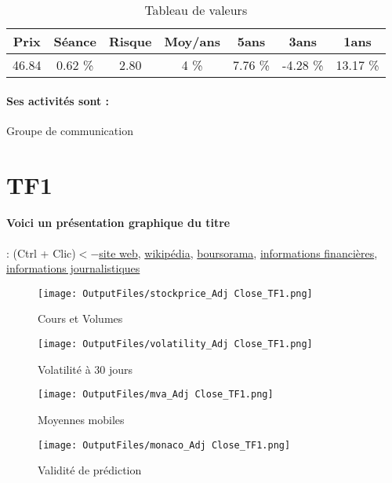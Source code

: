 \documentclass[11pt,a4paper]{report}%
\begin{document}
\begin{table}[H]
  \centering
    \begin{tabular}{|c|c|c|c|c|c|c|}
    \hline
    Prix & Séance & Risque  & Moy/ans & 5ans & 3ans & 1ans \\
    \hline
    46.84 &    0.62 \%    & 2.80 & 4 \% & 7.76 \% & -4.28 \% & 13.17 \% \\
    \hline
    \end{tabular}%
        \label{tab:table_PUBLICIS GROUPE}%
      \caption{Tableau de valeurs}
\end{table}%

\paragraph{Ses activités sont : } Groupe de communication 
    
    \newpage

\section{TF1}

\paragraph{Voici un présentation graphique du titre} : (Ctrl + Clic)$<-$\href{https://groupe-tf1.fr/fr/investisseurs/resultat-et-publication}{site web}, \href{https://fr.wikipedia.org/wiki/TF1}{wikipédia}, \href{https://www.boursorama.com/cours/1rPTFI}{boursorama}, \href{https://www.qwant.com/?q=site:https:%2f%2fwww.easybourse.com%2faction-societe%2fTF1&t=web&client=ext-firefox-hp}{informations financières}, \href{https://bourse.lerevenu.com/cours-de-bourse/fiche-valeur-synthese/TF1/TFI-FR}{informations journalistiques}
\begin{figure}[!htb]
   \begin{minipage}{0.5\textwidth}
     \centering
     \texttt{[image: OutputFiles/stockprice\_Adj Close\_TF1.png]}
     \caption{Cours et Volumes}\label{Fig:price_TF1}
   \end{minipage}\hfill
   \begin{minipage}{0.5\textwidth}
     \centering
     \texttt{[image: OutputFiles/volatility\_Adj Close\_TF1.png]}
     \caption{Volatilité à 30 jours}\label{Fig:volat_TF1}
   \end{minipage}
\end{figure}
\begin{figure}[!htb]
   \begin{minipage}{0.5\textwidth}
     \centering
     \texttt{[image: OutputFiles/mva\_Adj Close\_TF1.png]}
     \caption{Moyennes mobiles}\label{Fig:mva_TF1}
   \end{minipage}\hfill
   \begin{minipage}{0.5\textwidth}
     \centering
     \texttt{[image: OutputFiles/monaco\_Adj Close\_TF1.png]}
     \caption{Validité de prédiction}\label{Fig:prediction_TF1}
   \end{minipage}
\end{figure}
\end{document}
